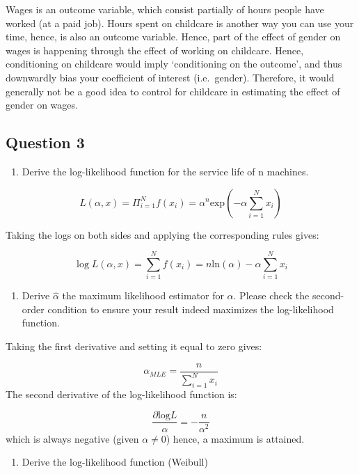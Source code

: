 \documentclass[
]{article}
\providecommand{\tightlist}{%
  \setlength{\itemsep}{0pt}\setlength{\parskip}{0pt}}
\begin{document}
Wages is an outcome variable, which consist partially of hours people
have worked (at a paid job). Hours spent on childcare is another way you
can use your time, hence, is also an outcome variable. Hence, part of
the effect of gender on wages is happening through the effect of working
on childcare. Hence, conditioning on childcare would imply `conditioning
on the outcome', and thus downwardly bias your coefficient of interest
(i.e.~gender). Therefore, it would generally not be a good idea to
control for childcare in estimating the effect of gender on wages.

\hypertarget{question-3}{%
\subsection{Question 3}\label{question-3}}

\begin{enumerate}
\def\labelenumi{\alph{enumi}.}
\tightlist
\item
  Derive the log-likelihood function for the service life of n machines.
\end{enumerate}

\[
L(\alpha, x) = \Pi_{i=1}^N f(x_i) = \alpha^n \text{exp}(-\alpha \sum_{i=1}^N x_i)
\]

Taking the logs on both sides and applying the corresponding rules
gives:

\[
\log L(\alpha, x) = \sum_{i=1}^N f(x_i) = n \text{ln}(\alpha) - \alpha \sum_{i=1}^N  x_i
\]

\begin{enumerate}
\def\labelenumi{\alph{enumi}.}
\setcounter{enumi}{1}
\tightlist
\item
  Derive \(\hat{\alpha}\) the maximum likelihood estimator for
  \(\alpha\). Please check the second-order condition to ensure your
  result indeed maximizes the log-likelihood function.
\end{enumerate}

Taking the first derivative and setting it equal to zero gives:

\[
\alpha_{MLE} = \frac{n}{\sum_{i=1}^N x_i}
\] The second derivative of the log-likelihood function is:

\[
\frac{\partial \text{log} L}{\alpha} = - \frac{n}{\alpha^2}
\] which is always negative (given \(\alpha \neq 0\)) hence, a maximum
is attained.

\begin{enumerate}
\def\labelenumi{\alph{enumi}.}
\setcounter{enumi}{2}
\tightlist
\item
  Derive the log-likelihood function (Weibull)
\end{enumerate}
\end{document}
